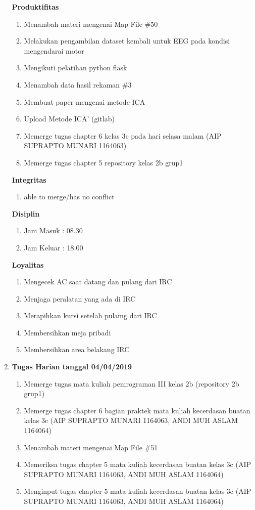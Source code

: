 \begin{enumerate}
\textbf{Produktifitas}
\begin{enumerate}
\item Menambah materi mengenai Map File \#50
\item Melakukan pengambilan dataset kembali untuk EEG pada kondisi mengendarai motor
\item Mengikuti pelatihan python flask
\item Menambah data hasil rekaman \#3
\item Membuat paper mengenai metode ICA 
\item Upload Metode ICA' (gitlab)
\item Memerge tugas chapter 6 kelas 3c pada hari selasa malam (AIP SUPRAPTO MUNARI 1164063)
\item Memerge tugas chapter 5 repository kelas 2b grup1
\end{enumerate}

\textbf{Integritas}
\begin{enumerate}
\item able to merge/has no conflict
\end{enumerate}

\textbf{Disiplin}
\begin{enumerate}
\item Jam Masuk : 08.30
\item Jam Keluar : 18.00
\end{enumerate}

\textbf{Loyalitas}
\begin{enumerate}
\item Mengecek AC saat datang dan pulang dari IRC
\item Menjaga peralatan yang ada di IRC
\item Merapihkan kursi setelah pulamg dari IRC
\item Membersihkan meja pribadi
\item Membersihkan area belakang IRC
\end{enumerate}

\item \textbf{Tugas Harian tanggal 04/04/2019}
\begin{enumerate}
\item Memerge tugas mata kuliah pemrograman III kelas 2b (repository 2b grup1)
\item Memerge tugas chapter 6 bagian praktek mata kuliah kecerdasan buatan kelas 3c (AIP SUPRAPTO MUNARI 1164063, ANDI MUH ASLAM 1164064)
\item Menambah materi mengenai Map File \#51
\item Memeriksa tugas chapter 5 mata kuliah kecerdasan buatan kelas 3c (AIP SUPRAPTO MUNARI 1164063, ANDI MUH ASLAM 1164064)
\item Menginput tugas chapter 5 mata kuliah kecerdasan buatan kelas 3c (AIP SUPRAPTO MUNARI 1164063, ANDI MUH ASLAM 1164064) 
\end{enumerate}


\end{enumerate}

